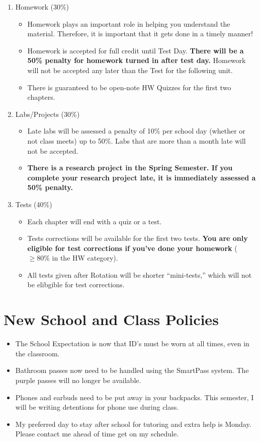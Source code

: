 \documentclass[10pt]{exam}
\begin{document}
\begin{enumerate}
	\item	Homework (30\%)
	\begin{itemize}
		\item 
			Homework plays an important role in helping you understand the material.  Therefore, it is important that it gets done in a timely manner! 
		\item 
			Homework is accepted for full credit until Test Day.  \textbf{There will be a 50\% penalty for homework turned in after test day.}  Homework will not be accepted any later than the Test for the following unit.
    \item 
      There is guaranteed to be open-note HW Quizzes for the first two chapters.
	\end{itemize} \hfill
	\item	Labs/Projects (30\%)
	\begin{itemize}
		\item 
			Late labs will be assessed a penalty of 10\% per school day (whether or not class meets) up to 50\%.  Labs that are more than a month late will not be accepted.
		\item 
		  {\bf There is a research project in the Spring Semester.  If you complete your research project late, it is immediately assessed a 50\% penalty.}
	\end{itemize} \hfill
	\item	Tests (40\%)
	\begin{itemize}
		\item	
			Each chapter will end with a quiz or a test.
		\item 
			Tests corrections will be available for the first two tests.  \textbf{You are only eligible for test corrections if you've done your homework} ($\ge 80\%$ in the HW category).
    \item 
      All tests given after Rotation will be shorter ``mini-tests,'' which will not be elibgible for test corrections.
	\end{itemize}
	
\end{enumerate}

\section*{New School and Class Policies}
\begin{itemize}
	\item The School Expectation is now that ID's must be worn at all times, even in the classroom.
	\item Bathroom passes now need to be handled using the SmartPass system.  The purple passes will no longer be available.
	\item Phones and earbuds need to be put away in your backpacks.  This semester, I will be writing detentions for phone use during class.
	\item My preferred day to stay after school for tutoring and extra help is Monday.  Please contact me ahead of time get on my schedule.
\end{itemize}

\vspace{-.4em}
\end{document}
